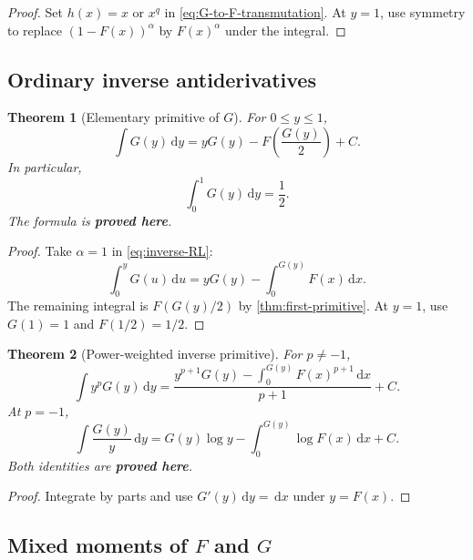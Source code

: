 \documentclass[11pt]{article}
\newcommand{\statusproved}{\textcolor{statusgreen}{\textbf{proved here}}}
\newtheorem{theorem}{Theorem}[section]
\theoremstyle{definition}
\theoremstyle{remark}
\newcommand{\dd}{\,\mathrm d}
\begin{document}
\begin{proof}
Set $h(x)=x$ or $x^q$ in \cref{eq:G-to-F-transmutation}.  At $y=1$, use symmetry to
replace $(1-F(x))^\alpha$ by $F(x)^\alpha$ under the integral.
\end{proof}

\subsection{Ordinary inverse antiderivatives}

\begin{theorem}[Elementary primitive of $G$]
\label{thm:inverse-primitive}
For $0\le y\le1$,
\begin{equation}
 \boxed{\int G(y)\dd y
 =yG(y)-F\!\left(\frac{G(y)}2\right)+C.}
 \label{eq:inverse-primitive}
\end{equation}
In particular,
\begin{equation}
 \int_0^1G(y)\dd y=\frac12.
 \label{eq:inverse-mean}
\end{equation}
The formula is \statusproved.
\end{theorem}

\begin{proof}
Take $\alpha=1$ in \cref{eq:inverse-RL}:
\[
 \int_0^yG(u)\dd u=yG(y)-\int_0^{G(y)}F(x)\dd x.
\]
The remaining integral is $F(G(y)/2)$ by \cref{thm:first-primitive}.  At $y=1$, use
$G(1)=1$ and $F(1/2)=1/2$.
\end{proof}

\begin{theorem}[Power-weighted inverse primitive]
\label{thm:weighted-inverse}
For $p\ne-1$,
\begin{equation}
 \int y^pG(y)\dd y
 =\frac{y^{p+1}G(y)-\displaystyle\int_0^{G(y)}F(x)^{p+1}\dd x}{p+1}+C.
 \label{eq:weighted-inverse}
\end{equation}
At $p=-1$,
\begin{equation}
 \int\frac{G(y)}y\dd y
 =G(y)\log y-\int_0^{G(y)}\log F(x)\dd x+C.
 \label{eq:log-weight-inverse}
\end{equation}
Both identities are \statusproved.
\end{theorem}

\begin{proof}
Integrate by parts and use $G'(y)\dd y=\dd x$ under $y=F(x)$.
\end{proof}

\subsection{Mixed moments of $F$ and $G$}
\end{document}
